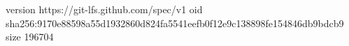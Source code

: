 version https://git-lfs.github.com/spec/v1
oid sha256:9170e88598a55d1932860d824fa5541eefb0f12e9c138898fe154846db9bdcb9
size 196704
